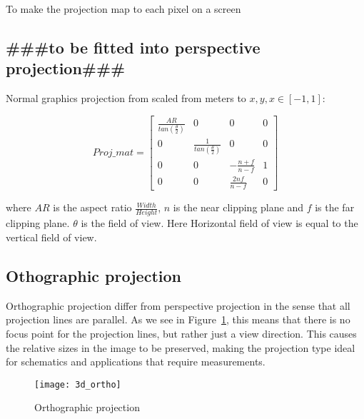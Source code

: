 To make the projection map to each pixel on a screen 

\subsection*{\#\#\#to be fitted into perspective projection\#\#\#}
Normal graphics projection from scaled from meters to $x,y,x \in [-1,1]$:

\begin{equation}
    Proj\_mat = \begin{bmatrix}
        \frac{AR}{tan(\frac{\theta}{2})}    &   0                                   &   0   &   0   \\
        0                                   &   \frac{1}{tan(\frac{\theta}{2})}    &   0   &   0   \\
        0                                   &   0                                   &   -\frac{n+f}{n-f} & 1\\
        0                                   &   0                                   &   \frac{2nf}{n-f} & 0
    \end{bmatrix}
\end{equation}

where $AR$ is the aspect ratio $\frac{Width}{Height}$, $n$ is the near clipping plane and $f$ is the far clipping plane. $\theta$ is the field of view. Here Horizontal field of view is equal to the vertical field of view.


\subsection{Othographic projection}

Orthographic projection differ from perspective projection in the sense that all projection lines are parallel. As we see in Figure~\ref{fig:orthographic_projection}, this means that there is no focus point for the projection lines, but rather just a view direction. This causes the relative sizes in the image to be preserved, making the projection type ideal for schematics and applications that require measurements.

\begin{figure}[!htb]
    \centering
    \texttt{[image: 3d\_ortho]}
    \caption{Orthographic projection}
    \label{fig:orthographic_projection}
\end{figure}



